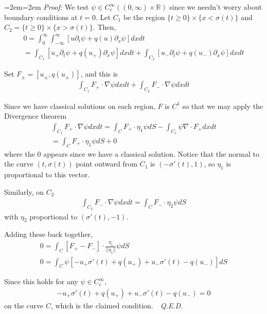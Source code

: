 \documentclass{article}
\newcommand{\R}{{\mathbb{R}}}
\newcommand{ \norm }[1]{{ || {#1}||}}
\newcommand{\pd}{\partial}
\newcommand{\CC}{C_{c}^{\infty}}
\newenvironment{pf}{%
	\par%
	\medskip
	\leftskip=2em\rightskip=2em%
	\noindent\ignorespaces \textit{Proof:} \newline}{%
	\,\, \newline \textit{Q.E.D.}\par\medskip}
\begin{document}
	\begin{pf}
		We test $\psi \in \CC((0,\infty) \times \R)$ since we needn't worry about boundary conditions at $t=0$. Let $C_{1}$ be the region $\{t \geq 0\} \times \{ x < \sigma(t)\}$ and $C_{2} = \{t \geq 0\} \times \{ x > \sigma(t)\}$. Then,
		\begin{align*}
			0 =\int_{0}^{\infty} \int_{-\infty}^{\infty} \left[u \pd_{t} \psi + q(u)\pd_{x} \psi \right] dx dt \\
			= \int_{C_1} \left[u_+ \pd_{t} \psi + q(u_+)\pd_{x} \psi \right]dxdt + \int_{C_2} \left[u_- \pd_{t} \psi + q(u_-)\pd_{x} \psi \right]dxdt
		\end{align*}
		
		Set $F_{\pm} = [u_{\pm},q(u_{\pm})]$, and this is 
		\begin{align*}
			\int_{C_1} F_+ \cdot \nabla \psi dxdt + \int_{C_2} F_- \cdot \nabla \psi dxdt
		\end{align*}
		
		Since we have classical solutions on each region, $F$ is $C^{1}$ so that we may apply the Divergence theorem
		\begin{align*}
			\int_{C_1} F_+ \cdot \nabla \psi dxdt = \int_{C} F_{+} \cdot \eta_1 \psi dS - \int_{C_1} \psi\nabla \cdot F_+ dxdt \\ = \int_{C} F_{+} \cdot \eta_{1} \psi dS+0
		\end{align*}
		where the 0 appears since we have a classical solution. Notice that the normal to the curve $(t,\sigma(t))$ point outward from $C_{1}$ is $(-\sigma'(t),1)$, so $\eta_{1}$ is proportional to this vector. 
		
		Similarly, on $C_{2}$
		\begin{align*}
			\int_{C_2} F_- \cdot \nabla \psi dxdt = \int_{C} F_{-} \cdot \eta_{2} \psi dS
		\end{align*}
		with $\eta_2$ proportional to $(\sigma'(t),-1)$. 
		
		Adding these back together, 
		\begin{align*}
			0 = \int_{C} [F_{+} - F_{-}] \cdot \frac{\eta_{1}}{\norm{\eta_1}}\psi dS \\
		0 	= \int_{C} \psi \left[-u_{+}\sigma'(t) + q(u_+) + u_{-} \sigma'(t) - q(u_-) \right] dS
		\end{align*}
		
		Since this holds for any $\psi \in \CC$, 
		\begin{align*}
			-u_{+}\sigma'(t) + q(u_+) + u_{-} \sigma'(t) - q(u_-) = 0
		\end{align*}
		on the curve $C$, which is the claimed condition. 
	\end{pf}
	
\end{document}
